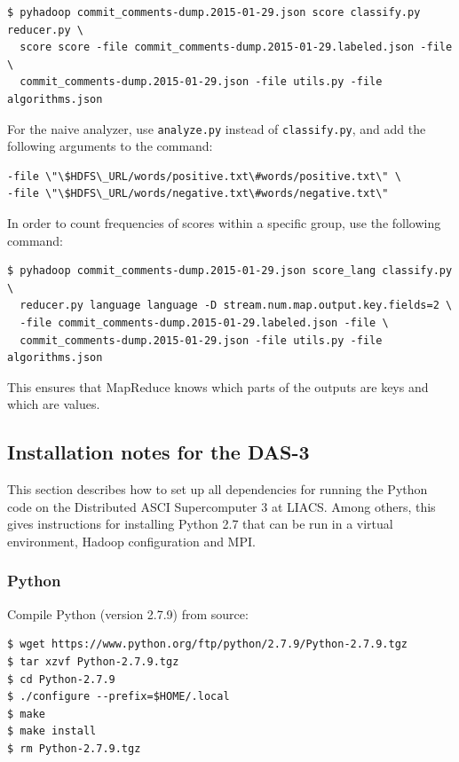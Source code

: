 \documentclass{article}
\begin{document}
\begin{verbatim}
$ pyhadoop commit_comments-dump.2015-01-29.json score classify.py reducer.py \
  score score -file commit_comments-dump.2015-01-29.labeled.json -file \
  commit_comments-dump.2015-01-29.json -file utils.py -file algorithms.json
\end{verbatim}

For the naive analyzer, use \texttt{analyze.py} instead of 
\texttt{classify.py}, and add the following arguments to the 
command:
\begin{verbatim}
-file \"\$HDFS\_URL/words/positive.txt\#words/positive.txt\" \
-file \"\$HDFS\_URL/words/negative.txt\#words/negative.txt\"
\end{verbatim}

In order to count frequencies of scores within a specific group, use the 
following command:

\begin{verbatim}
$ pyhadoop commit_comments-dump.2015-01-29.json score_lang classify.py \
  reducer.py language language -D stream.num.map.output.key.fields=2 \
  -file commit_comments-dump.2015-01-29.labeled.json -file \
  commit_comments-dump.2015-01-29.json -file utils.py -file algorithms.json
\end{verbatim}

This ensures that MapReduce knows which parts of the outputs are keys and which 
are values.

\subsection{Installation notes for the DAS-3}\label{app:installation-notes}
This section describes how to set up all dependencies for running the Python
code on the Distributed ASCI Supercomputer 3 at LIACS\@. Among others, this
gives instructions for installing Python 2.7 that can be run in a virtual
environment, Hadoop configuration and MPI.

\subsubsection{Python}\label{app:python}
Compile Python (version 2.7.9) from source:

\begin{verbatim}
$ wget https://www.python.org/ftp/python/2.7.9/Python-2.7.9.tgz
$ tar xzvf Python-2.7.9.tgz
$ cd Python-2.7.9
$ ./configure --prefix=$HOME/.local
$ make
$ make install
$ rm Python-2.7.9.tgz
\end{verbatim}
\end{document}
